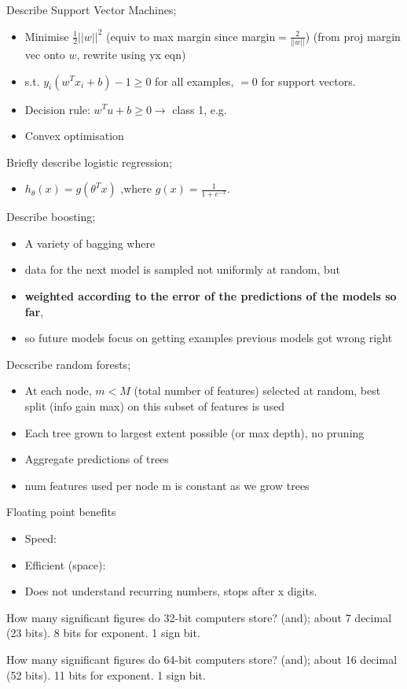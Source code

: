 \documentclass{article}
\begin{document}
Describe Support Vector Machines; \begin{itemize} \item Minimise $\frac{1}{2}||w||^2$ (equiv to max margin since margin$=\frac{2}{||w||}$) (from proj margin vec onto $w$, rewrite using yx eqn) \item s.t. $y_i(w^Tx_i+b)-1\geq 0$ for all examples, $=0$ for support vectors.  \item Decision rule: $w^Tu+b\geq 0\rightarrow$ class 1, e.g.  \item Convex optimisation \end{itemize}

Briefly describe logistic regression; \begin{itemize} \item $h_{\theta}(x) = g(\theta^Tx)$ ,where $g(x)=\frac{1}{1+e^{-x}}$.  \end{itemize}

Describe boosting; \begin{itemize} \item A variety of bagging where \item data for the next model is sampled not uniformly at random, but \item \textbf{weighted according to the error of the predictions of the models so far}, \item so future models focus on getting examples previous models got wrong right \end{itemize}

Decscribe random forests; \begin{itemize} \item At each node, $m<M$ (total number of features) selected at random, best split (info gain max) on this subset of features is used \item Each tree grown to largest extent possible (or max depth), no pruning \item Aggregate predictions of trees \item num features used per node m is constant as we grow trees \end{itemize}

Floating point benefits \begin{itemize}
	\item Speed: 
	\item Efficient (space):
	\item Does not understand recurring numbers, stops after x digits.
\end{itemize}

How many significant figures do 32-bit computers store? (and); about 7 decimal (23 bits). 8 bits for exponent. 1 sign bit.

How many significant figures do 64-bit computers store? (and); about 16 decimal (52 bits). 11 bits for exponent. 1 sign bit.
\end{document}
